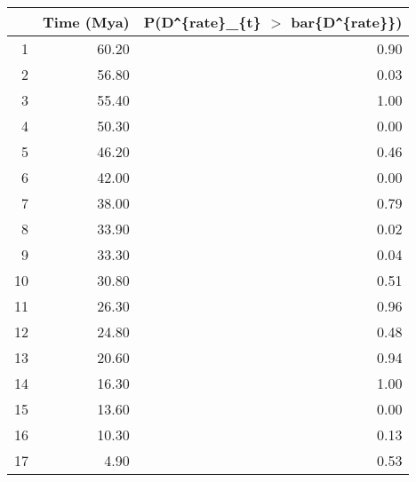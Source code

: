 \begin{table}[ht]
\centering
\begin{tabular}{rrr}
  \hline
 & Time (Mya) & P(D\verb|^|\{rate\}\_\{t\} $>$ bar\{D\verb|^|\{rate\}\}) \\ 
  \hline
1 & 60.20 & 0.90 \\ 
  2 & 56.80 & 0.03 \\ 
  3 & 55.40 & 1.00 \\ 
  4 & 50.30 & 0.00 \\ 
  5 & 46.20 & 0.46 \\ 
  6 & 42.00 & 0.00 \\ 
  7 & 38.00 & 0.79 \\ 
  8 & 33.90 & 0.02 \\ 
  9 & 33.30 & 0.04 \\ 
  10 & 30.80 & 0.51 \\ 
  11 & 26.30 & 0.96 \\ 
  12 & 24.80 & 0.48 \\ 
  13 & 20.60 & 0.94 \\ 
  14 & 16.30 & 1.00 \\ 
  15 & 13.60 & 0.00 \\ 
  16 & 10.30 & 0.13 \\ 
  17 & 4.90 & 0.53 \\ 
   \hline
\end{tabular}
\label{tab:rate_peak}
\end{table}
